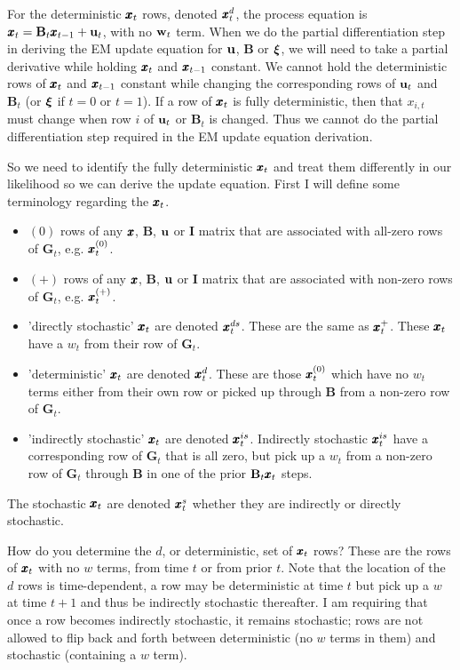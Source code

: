\documentclass[]{article}
\def\xixi{\mbox{\boldmath $\xi$}}
\def\UPS{\mbox{\boldmath $\Upsilon$}}
\def\BB{\mbox{$\mathbf B$}}	\def\bb{\mbox{$\mathbf b$}} \def\Bb{\mbox{$\mathbf J$}} \def\Ba{\mbox{$\mathbf L$}} \def\Bm{\UPS}
\def\GG{\mbox{$\mathbf G$}}	\def\gg{\mbox{$\mathbf g$}}
\def\II{\mbox{$\mathbf I$}} \def\ii{\mbox{$\mathbf i$}}
\begin{document}
For the  deterministic $\mbox{$\pmb{x}$}_t$ rows, denoted $\mbox{$\pmb{x}$}_t^d$, the process equation is $\xx_t = \BB_t\xx_{t-1}+\uu_t$, with no $\mbox{$\mathbf w$}_t$ term. When we do the partial differentiation step in deriving the EM update equation for $\mbox{$\mathbf u$}$, $\BB$ or $\xixi$, we will need to take a partial derivative  while holding $\mbox{$\pmb{x}$}_t$ and $\mbox{$\pmb{x}$}_{t-1}$ constant.   We cannot hold the deterministic rows of $\mbox{$\pmb{x}$}_t$ and $\mbox{$\pmb{x}$}_{t-1}$ constant while changing the corresponding rows of $\mbox{$\mathbf u$}_t$ and $\BB_t$ (or $\xixi$ if $t=0$ or $t=1$).  If a row of $\mbox{$\pmb{x}$}_t$ is fully deterministic, then that $x_{i,t}$ must change when row $i$ of $\mbox{$\mathbf u$}_t$ or $\BB_t$ is changed.  Thus we  cannot do the partial differentiation step required in the EM update equation derivation.  

So we need to identify the fully deterministic $\mbox{$\pmb{x}$}_t$ and treat them differently in our likelihood so we can derive the update equation.  First I will define some terminology regarding the $\mbox{$\pmb{x}$}_t$.
\begin{itemize}
  \item $(0)$ rows of any $\mbox{$\pmb{x}$}$, $\BB$, $\mbox{$\mathbf u$}$ or $\II$ matrix that are associated with all-zero rows of $\GG_t$, e.g. $\mbox{$\pmb{x}$}_t^{(0)}$.
  \item $(+)$ rows of any $\mbox{$\pmb{x}$}$, $\BB$, $\mbox{$\mathbf u$}$ or $\II$ matrix that are associated with non-zero rows of $\GG_t$, e.g. $\mbox{$\pmb{x}$}_t^{(+)}$.
  \item 'directly stochastic' $\mbox{$\pmb{x}$}_t$ are denoted $\mbox{$\pmb{x}$}_t^{ds}$. These are the same as $\mbox{$\pmb{x}$}_t^{+}$. These $\mbox{$\pmb{x}$}_t$ have a $w_t$ from their row of $\GG_t$.
  \item 'deterministic' $\mbox{$\pmb{x}$}_t$ are denoted $\mbox{$\pmb{x}$}_t^d$. These are those $\mbox{$\pmb{x}$}_t^{(0)}$ which have no $w_t$ terms either from their own row or picked up through $\BB$ from a non-zero row of $\GG_t$.
  \item 'indirectly stochastic' $\mbox{$\pmb{x}$}_t$ are denoted $\mbox{$\pmb{x}$}_t^{is}$. Indirectly stochastic $\mbox{$\pmb{x}$}_t^{is}$ have a corresponding row of $\GG_t$ that is all zero, but pick up a $w_t$ from a non-zero row of $\GG_t$ through $\BB$ in one of the prior $\BB_t\xx_t$ steps. 
\end{itemize}
The stochastic $\mbox{$\pmb{x}$}_t$ are denoted $\mbox{$\pmb{x}$}_t^s$ whether they are indirectly or directly stochastic.

How do you determine the $d$, or deterministic, set of $\mbox{$\pmb{x}$}_t$ rows?  These are the rows of $\mbox{$\pmb{x}$}_t$ with no $w$ terms, from time $t$ or from prior $t$.  Note that the location of the $d$ rows is time-dependent, a row may be deterministic at time $t$ but pick up a $w$ at time $t+1$ and thus be indirectly stochastic thereafter.  I am requiring that once a row becomes indirectly stochastic, it remains stochastic; rows are not allowed to flip back and forth between deterministic (no $w$ terms in them) and stochastic (containing a $w$ term).
\end{document}
